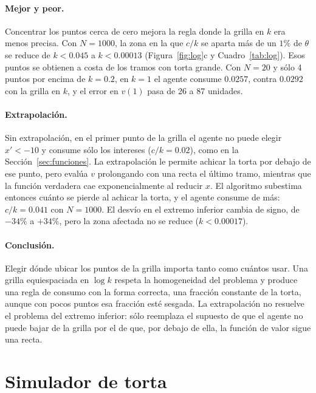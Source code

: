 \documentclass[11pt,a4paper]{article}
\begin{document}
\paragraph{Mejor y peor.} Concentrar los puntos cerca de cero mejora la regla donde la grilla en $k$ era menos precisa. Con $N=1000$, la zona en la que $c/k$ se aparta más de un $1\%$ de $\theta$ se reduce de $k<0.045$ a $k<0.00013$ (Figura~\ref{fig:log}c y Cuadro~\ref{tab:log}). Esos puntos se obtienen a costa de los tramos con torta grande. Con $N=20$ y sólo 4 puntos por encima de $k=0.2$, en $k=1$ el agente consume $0.0257$, contra $0.0292$ con la grilla en $k$, y el error en $v(1)$ pasa de 26 a 87 unidades.

\paragraph{Extrapolación.} Sin extrapolación, en el primer punto de la grilla el agente no puede elegir $x'<-10$ y consume sólo los intereses ($c/k=0.02$), como en la Sección~\ref{sec:funciones}. La extrapolación le permite achicar la torta por debajo de ese punto, pero evalúa $v$ prolongando con una recta el último tramo, mientras que la función verdadera cae exponencialmente al reducir $x$. El algoritmo subestima entonces cuánto se pierde al achicar la torta, y el agente consume de más: $c/k=0.041$ con $N=1000$. El desvío en el extremo inferior cambia de signo, de $-34\%$ a $+34\%$, pero la zona afectada no se reduce ($k<0.00017$).

\paragraph{Conclusión.} Elegir dónde ubicar los puntos de la grilla importa tanto como cuántos usar. Una grilla equiespaciada en $\log k$ respeta la homogeneidad del problema y produce una regla de consumo con la forma correcta, una fracción constante de la torta, aunque con pocos puntos esa fracción esté sesgada. La extrapolación no resuelve el problema del extremo inferior: sólo reemplaza el supuesto de que el agente no puede bajar de la grilla por el de que, por debajo de ella, la función de valor sigue una recta.



\section{Simulador de torta}
\label{sec:simulador}
\end{document}
